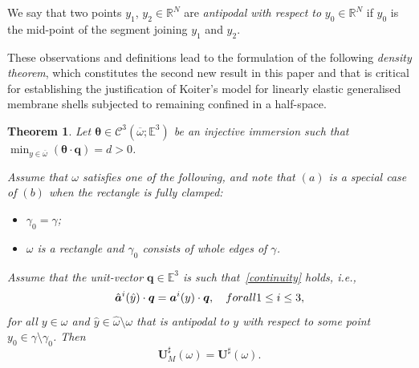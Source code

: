 \documentclass{amsart}
\newtheorem{theorem}{Theorem}[section]
\begin{document}
We say that two points $y_1$, $y_2\in\mathbb{R}^N$ are \emph{antipodal with respect to} $y_0 \in \mathbb{R}^N$ if $y_0$ is the mid-point of the segment joining $y_1$ and $y_2$.

These observations and definitions lead to the formulation of the following \emph{density theorem}, which constitutes the second new result in this paper and that is critical for establishing the justification of Koiter's model for linearly elastic generalised membrane shells subjected to remaining confined in a half-space.

\begin{theorem}
	\label{th:density}
	Let $\bm{\theta} \in \mathcal{C}^3(\overline{\omega};\mathbb{E}^3)$ be an injective immersion such that $\min_{y \in \overline{\omega}}(\bm{\theta} \cdot \bm{q})=d>0$.
	
	Assume that $\omega$ satisfies one of the following, and note that $(a)$ is a special case of $(b)$ when the rectangle is fully clamped:
	\begin{itemize}
		\item[$(a)$] $\gamma_0=\gamma$;
		\item[$(b)$] $\omega$ is a rectangle and $\gamma_0$ consists of whole edges of $\gamma$.
	\end{itemize}
	
	Assume that the unit-vector $\bm{q} \in \mathbb{E}^3$ is such that~\eqref{continuity} holds, i.e.,
	\begin{equation*}
		\hat{\bm{a}}^i(\hat{y}) \cdot \bm{q} = \bm{a}^i(y) \cdot\bm{q},\quad\textup{ for all }1\le i \le 3,
	\end{equation*}
	for all $y \in \omega$ and $\hat{y}\in\hat{\omega}\setminus\omega$ that is antipodal to $y$ with respect to some point $y_0 \in \gamma\setminus\gamma_0$.
	Then
	\begin{equation*}
		\bm{U}_M^\sharp(\omega)=\bm{U}^\sharp(\omega).
	\end{equation*}
\end{theorem}
\end{document}
